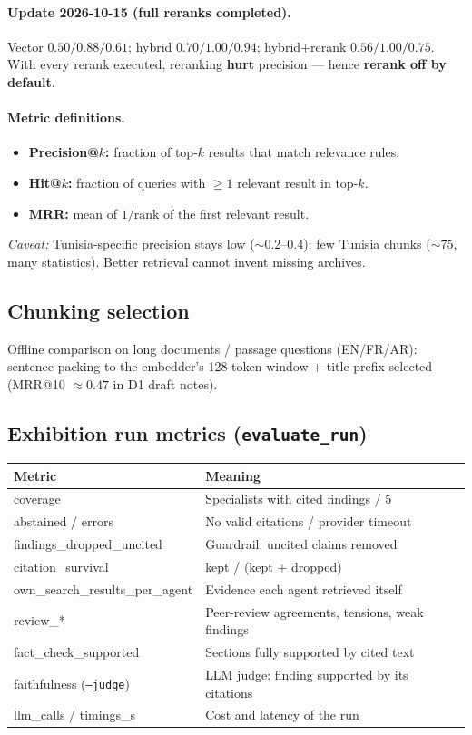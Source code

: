 \documentclass[11pt,a4paper]{article}
\begin{document}
\paragraph{Update 2026-10-15 (full reranks completed).}
Vector $0.50 / 0.88 / 0.61$; hybrid $0.70 / 1.00 / 0.94$; hybrid+rerank
$0.56 / 1.00 / 0.75$. With every rerank executed, reranking \textbf{hurt}
precision --- hence \textbf{rerank off by default}.

\paragraph{Metric definitions.}
\begin{itemize}[nosep]
  \item \textbf{Precision@$k$:} fraction of top-$k$ results that match relevance rules.
  \item \textbf{Hit@$k$:} fraction of queries with $\ge 1$ relevant result in top-$k$.
  \item \textbf{MRR:} mean of $1/\text{rank}$ of the first relevant result.
\end{itemize}

\noindent\textit{Caveat:} Tunisia-specific precision stays low ($\sim$0.2--0.4): few
Tunisia chunks ($\sim$75, many statistics). Better retrieval cannot invent missing archives.

\subsection{Chunking selection}

Offline comparison on long documents / passage questions (EN/FR/AR): sentence packing
to the embedder's 128-token window + title prefix selected (MRR@10 $\approx 0.47$
in D1 draft notes).

\subsection{Exhibition run metrics (\texttt{evaluate\_run})}

\begin{tabular}{@{}lp{10cm}@{}}
\toprule
\textbf{Metric} & \textbf{Meaning} \\
\midrule
coverage & Specialists with cited findings / 5 \\
abstained / errors & No valid citations / provider timeout \\
findings\_dropped\_uncited & Guardrail: uncited claims removed \\
citation\_survival & kept / (kept + dropped) \\
own\_search\_results\_per\_agent & Evidence each agent retrieved itself \\
review\_* & Peer-review agreements, tensions, weak findings \\
fact\_check\_supported & Sections fully supported by cited text \\
faithfulness (\texttt{--judge}) & LLM judge: finding supported by its citations \\
llm\_calls / timings\_s & Cost and latency of the run \\
\bottomrule
\end{tabular}
\end{document}
